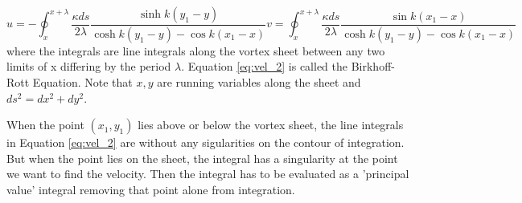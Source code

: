 \documentclass{article}
\begin{document}
\begin{subequations}\label{eq:vel_2}
\begin{equation}
u= -\oint_x^{x+\lambda} \frac{\kappa ds}{2\lambda} \frac{\sinh k(y_1-y)}{\cosh k(y_1-y)-\cos k(x_1-x)}
\end{equation}
\begin{equation}
v= \oint_x^{x+\lambda} \frac{\kappa ds}{2\lambda} \frac{\sin k(x_1-x)}{\cosh k(y_1-y)-\cos k(x_1-x)}
\end{equation}
\end{subequations}
where the integrals are line integrals along the vortex sheet between any two limits of x differing by the period $\lambda$. Equation \eqref{eq:vel_2} is called the Birkhoff-Rott Equation. Note that $x,y$ are running variables along the sheet and $ds^2=dx^2+dy^2$.

When the point $(x_1,y_1)$ lies above or below the vortex sheet, the line integrals in Equation \eqref{eq:vel_2} are without any sigularities on the contour of integration. But when the point lies on the sheet, the integral has a singularity at the point we want to find the velocity. Then the integral has to be evaluated as a 'principal value' integral removing that point alone from integration. 
\end{document}
